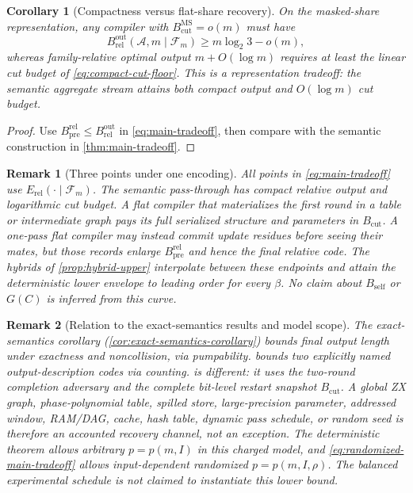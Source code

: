 \documentclass[a4paper,twocolumn,10pt,unpublished]{quantumarticle}
\newtheorem{corollary}{Corollary}
\newtheorem{remark}{Remark}
\begin{document}
\begin{corollary}[Compactness versus flat-share recovery]
\label{cor:output-inflation}
On the masked-share representation, any compiler with
$B_{\mathrm{cut}}^{\mathrm{MS}}=o(m)$ must have
\begin{equation*}
 B_{\mathrm{rel}}^{\mathrm{out}}(\mathcal A,m\mid\mathcal F_m)
 \geq m\log_2 3-o(m),
\end{equation*}
whereas family-relative optimal output $m+O(\log m)$ requires at least the linear
cut budget of \eqref{eq:compact-cut-floor}.  This is a representation
tradeoff: the semantic aggregate stream attains both compact output and
$O(\log m)$ cut budget.
\end{corollary}

\begin{proof}
Use $B_{\mathrm{pre}}^{\mathrm{rel}}\leq
B_{\mathrm{rel}}^{\mathrm{out}}$ in \eqref{eq:main-tradeoff}, then compare
with the semantic construction in \cref{thm:main-tradeoff}.
\end{proof}

\begin{remark}[Three points under one encoding]
\label{rem:corners}
All points in \eqref{eq:main-tradeoff} use
$E_{\mathrm{rel}}(\cdot\mid\mathcal F_m)$.  The semantic pass-through has
compact relative output and logarithmic cut budget.  A flat compiler that
materializes the first round in a table or intermediate graph pays its
full serialized structure and parameters in $B_{\mathrm{cut}}$.  A
one-pass flat compiler may instead commit update residues before seeing
their mates, but those records enlarge $B_{\mathrm{pre}}^{\mathrm{rel}}$
and hence the final relative code.  The hybrids of
\cref{prop:hybrid-upper} interpolate between these endpoints and attain the
deterministic lower envelope to leading order for every $\beta$.  No claim
about $B_{\mathrm{self}}$ or $G(C)$ is inferred from this curve.
\end{remark}

\begin{remark}[Relation to the exact-semantics results and model scope]
\label{rem:three-channels}
The exact-semantics corollary
(\cref{cor:exact-semantics-corollary}) bounds final output length under
exactness and noncollision, via pumpability.  
bounds two explicitly named output-description codes via counting.
 is different: it uses the two-round completion
adversary and the complete bit-level restart snapshot
$B_{\mathrm{cut}}$.  A global ZX graph, phase-polynomial table, spilled
store, large-precision parameter, addressed window, RAM/DAG, cache, hash
table, dynamic pass schedule, or random seed is therefore an accounted
recovery channel, not an exception.  The deterministic theorem allows
arbitrary $p=p(m,I)$ in this charged model, and
\eqref{eq:randomized-main-tradeoff} allows input-dependent randomized
$p=p(m,I,\rho)$.  The balanced experimental schedule is not claimed to
instantiate this lower bound.
\end{remark}
\end{document}
